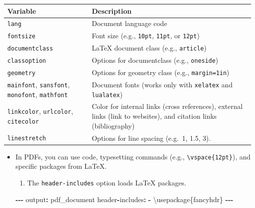\documentclass[
]{book}
\newenvironment{Shaded}{\begin{snugshade}}{\end{snugshade}}
\newcommand{\NormalTok}[1]{#1}
\newcommand{\SpecialCharTok}[1]{\textcolor[rgb]{0.81,0.36,0.00}{\textbf{#1}}}
\providecommand{\tightlist}{%
  \setlength{\itemsep}{0pt}\setlength{\parskip}{0pt}}
\begin{document}
\begin{itemize}
  \begin{longtable}[]{@{}
    >{\raggedright\arraybackslash}p{}
    >{\raggedright\arraybackslash}p{}@{}}
  \toprule\noalign{}
  \begin{minipage}[b]{\linewidth}\raggedright
  Variable
  \end{minipage} & \begin{minipage}[b]{\linewidth}\raggedright
  Description
  \end{minipage} \\
  \midrule\noalign{}
  \endhead
  \bottomrule\noalign{}
  \endlastfoot
  \texttt{lang} & Document language code \\
  \texttt{fontsize} & Font size (e.g., \texttt{10pt}, \texttt{11pt}, or \texttt{12pt}) \\
  \texttt{documentclass} & LaTeX document class (e.g., \texttt{article}) \\
  \texttt{classoption} & Options for documentclass (e.g., \texttt{oneside}) \\
  \texttt{geometry} & Options for geometry class (e.g., \texttt{margin=1in}) \\
  \texttt{mainfont}, \texttt{sansfont}, \texttt{monofont}, \texttt{mathfont} & Document fonts (works only with \texttt{xelatex} and \texttt{lualatex}) \\
  \texttt{linkcolor}, \texttt{urlcolor}, \texttt{citecolor} & Color for internal links (cross references), external links (link to websites), and citation links (bibliography) \\
  \texttt{linestretch} & Options for line spacing (e.g.~1, 1.5, 3). \\
  \end{longtable}

  \begin{itemize}
  \item
    In PDFs, you can use code, typesetting commands (e.g., \texttt{\textbackslash{}vspace\{12pt\}}), and specific packages from LaTeX.

    \begin{enumerate}
    \def\labelenumi{\arabic{enumi}.}
    \tightlist
    \item
      The \texttt{header-includes} option loads LaTeX packages.
    \end{enumerate}

\begin{Shaded}
\begin{Highlighting}[]
\SpecialCharTok{{-}{-}{-}}
\NormalTok{output}\SpecialCharTok{:}\NormalTok{ pdf\_document}
\NormalTok{header}\SpecialCharTok{{-}}\NormalTok{includes}\SpecialCharTok{:}
\SpecialCharTok{{-}}\NormalTok{ \textbackslash{}usepackage\{fancyhdr\}}
\SpecialCharTok{{-}{-}{-}}


\end{Highlighting}
\end{Shaded}
\end{itemize}
\end{itemize}
\end{document}
